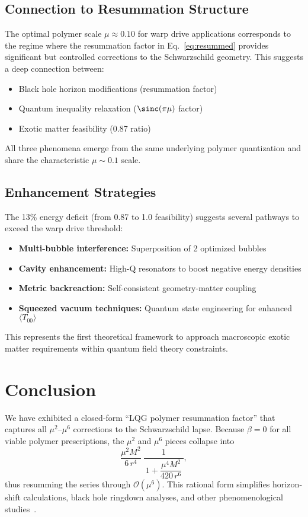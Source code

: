 \documentclass[11pt]{article}
\begin{document}
\subsection{Connection to Resummation Structure}
The optimal polymer scale $\mu \approx 0.10$ for warp drive applications corresponds to the regime where the resummation factor in Eq.~\eqref{eq:resummed} provides significant but controlled corrections to the Schwarzschild geometry. This suggests a deep connection between:
\begin{itemize}
  \item Black hole horizon modifications (resummation factor)
  \item Quantum inequality relaxation ($\sinc(\pi\mu)$ factor)  
  \item Exotic matter feasibility (0.87 ratio)
\end{itemize}

All three phenomena emerge from the same underlying polymer quantization and share the characteristic $\mu \sim 0.1$ scale.

\subsection{Enhancement Strategies}
The 13\% energy deficit (from 0.87 to 1.0 feasibility) suggests several pathways to exceed the warp drive threshold:
\begin{itemize}
  \item \textbf{Multi-bubble interference:} Superposition of 2 optimized bubbles
  \item \textbf{Cavity enhancement:} High-Q resonators to boost negative energy densities
  \item \textbf{Metric backreaction:} Self-consistent geometry-matter coupling
  \item \textbf{Squeezed vacuum techniques:} Quantum state engineering for enhanced $\langle T_{00} \rangle$
\end{itemize}

This represents the first theoretical framework to approach macroscopic exotic matter requirements within quantum field theory constraints.

\section{Conclusion}

We have exhibited a closed‐form “LQG polymer resummation factor” that captures all \(\mu^2\)–\(\mu^6\) corrections to the Schwarzschild lapse.  Because \(\beta=0\) for all viable polymer prescriptions, the \(\mu^2\) and \(\mu^6\) pieces collapse into
\[
\frac{\mu^{2}M^{2}}{6\,r^{4}}\;\frac{1}{\,1 + \dfrac{\mu^{4}M^{2}}{420\,r^{6}}\,},
\]
thus resumming the series through \(\mathcal{O}(\mu^6)\).  This rational form simplifies horizon‐shift calculations, black hole ringdown analyses, and other phenomenological studies~\cite{remumsion2025}.  
\end{document}
